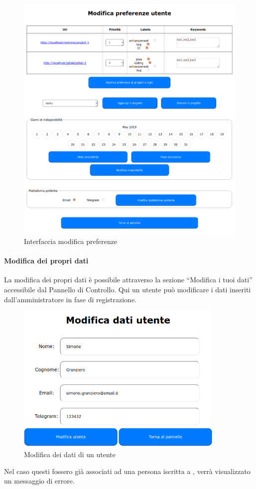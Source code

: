 \begin{figure}[H]
	\centering
	\includegraphics[width=16cm]{img/preferenze_1.png}
	\caption{Interfaccia modifica preferenze}
\end{figure}

\paragraph{Modifica dei propri dati}
La modifica dei propri dati è possibile attraverso la sezione ``Modifica i tuoi dati'' accessibile dal Pannello di Controllo.
Qui un utente può modificare i dati inseriti dall'amministratore in fase di registrazione.
\begin{figure}[H]
	\centering
	\includegraphics[width=10cm]{img/modifica_1.png}
	\caption{Modifica dei dati di un utente}
\end{figure}
Nel caso questi fossero già associati ad una persona iscritta a \progetto, verrà visualizzato un messaggio di errore.

